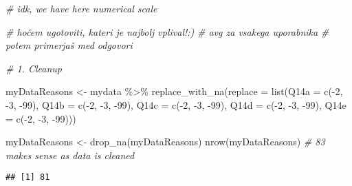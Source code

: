 \documentclass[
]{article}
\newenvironment{Shaded}{\begin{snugshade}}{\end{snugshade}}
\newcommand{\AttributeTok}[1]{\textcolor[rgb]{0.77,0.63,0.00}{#1}}
\newcommand{\CommentTok}[1]{\textcolor[rgb]{0.56,0.35,0.01}{\textit{#1}}}
\newcommand{\DecValTok}[1]{\textcolor[rgb]{0.00,0.00,0.81}{#1}}
\newcommand{\FunctionTok}[1]{\textcolor[rgb]{0.00,0.00,0.00}{#1}}
\newcommand{\NormalTok}[1]{#1}
\newcommand{\OtherTok}[1]{\textcolor[rgb]{0.56,0.35,0.01}{#1}}
\newcommand{\SpecialCharTok}[1]{\textcolor[rgb]{0.00,0.00,0.00}{#1}}
\begin{document}
\begin{Shaded}
\begin{Highlighting}[]
\CommentTok{\# idk, we have here numerical scale}

\CommentTok{\# hočem ugotoviti, kateri je najbolj vplival!:)}
\CommentTok{\# avg za vsakega uporabnika}
\CommentTok{\# potem primerjaš med odgovori}

\CommentTok{\# 1. Cleanup}

\NormalTok{myDataReasons }\OtherTok{\textless{}{-}}\NormalTok{ mydata }\SpecialCharTok{\%\textgreater{}\%} \FunctionTok{replace\_with\_na}\NormalTok{(}\AttributeTok{replace =} \FunctionTok{list}\NormalTok{(}\AttributeTok{Q14a =} \FunctionTok{c}\NormalTok{(}\SpecialCharTok{{-}}\DecValTok{2}\NormalTok{, }\SpecialCharTok{{-}}\DecValTok{3}\NormalTok{, }\SpecialCharTok{{-}}\DecValTok{99}\NormalTok{), }\AttributeTok{Q14b =} \FunctionTok{c}\NormalTok{(}\SpecialCharTok{{-}}\DecValTok{2}\NormalTok{, }\SpecialCharTok{{-}}\DecValTok{3}\NormalTok{, }\SpecialCharTok{{-}}\DecValTok{99}\NormalTok{), }\AttributeTok{Q14c =} \FunctionTok{c}\NormalTok{(}\SpecialCharTok{{-}}\DecValTok{2}\NormalTok{, }\SpecialCharTok{{-}}\DecValTok{3}\NormalTok{, }\SpecialCharTok{{-}}\DecValTok{99}\NormalTok{), }\AttributeTok{Q14d =} \FunctionTok{c}\NormalTok{(}\SpecialCharTok{{-}}\DecValTok{2}\NormalTok{, }\SpecialCharTok{{-}}\DecValTok{3}\NormalTok{, }\SpecialCharTok{{-}}\DecValTok{99}\NormalTok{), }\AttributeTok{Q14e =} \FunctionTok{c}\NormalTok{(}\SpecialCharTok{{-}}\DecValTok{2}\NormalTok{, }\SpecialCharTok{{-}}\DecValTok{3}\NormalTok{, }\SpecialCharTok{{-}}\DecValTok{99}\NormalTok{)))}

\NormalTok{myDataReasons }\OtherTok{\textless{}{-}} \FunctionTok{drop\_na}\NormalTok{(myDataReasons)}
\FunctionTok{nrow}\NormalTok{(myDataReasons) }\CommentTok{\# 83 makes sense as data is cleaned}
\end{Highlighting}
\end{Shaded}

\begin{verbatim}
## [1] 81
\end{verbatim}
\end{document}

